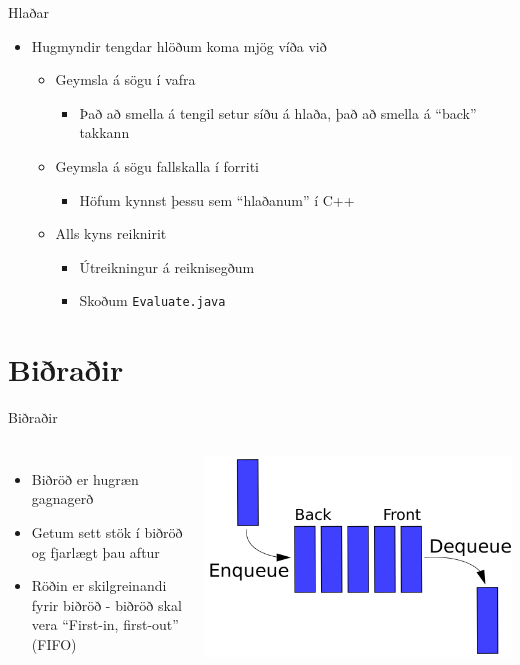 \documentclass[handout]{beamer}
\begin{document}
\begin{frame}{Hlaðar}
\begin{itemize}
 \item Hugmyndir tengdar hlöðum koma mjög víða við
 \begin{itemize}
  \item Geymsla á sögu í vafra
  \begin{itemize}
   \item Það að smella á tengil setur síðu á hlaða, það að smella á ``back'' takkann 
  \end{itemize}
 \item Geymsla á sögu fallskalla í forriti
  \begin{itemize}
   \item Höfum kynnst þessu sem ``hlaðanum'' í C++
  \end{itemize}
 \item Alls kyns reiknirit
 \begin{itemize}
  \item Útreikningur á reiknisegðum
  \item Skoðum \texttt{Evaluate.java}
 \end{itemize}
 \end{itemize}
\end{itemize}
\end{frame}

\section{Biðraðir}

\begin{frame}{Biðraðir}
\begin{columns}[c]
\begin{itemize}
 \item Biðröð er hugræn gagnagerð
 \item Getum sett stök í biðröð og fjarlægt þau aftur
 \item Röðin er skilgreinandi fyrir biðröð - biðröð skal vera ``First-in, first-out'' (FIFO) 
\end{itemize}
\includegraphics[width=\linewidth]{Pics/queue}
\end{columns}
\end{frame}
\end{document}
